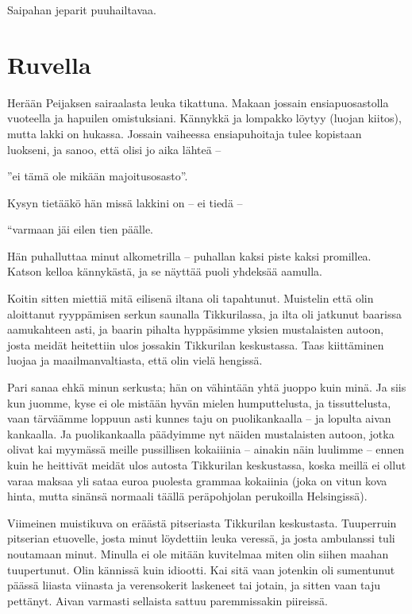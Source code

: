 \documentclass{tsnovel}
\begin{document}
Saipahan jeparit puuhailtavaa.


\section{Ruvella}
Herään Peijaksen sairaalasta leuka tikattuna. Makaan jossain ensiapuosastolla vuoteella ja hapuilen omistuksiani. Kännykkä ja lompakko löytyy (luojan kiitos), mutta lakki on hukassa. Jossain vaiheessa ensiapuhoitaja tulee kopistaan luokseni, ja sanoo, että olisi jo aika lähteä –

''ei tämä ole mikään majoitusosasto''.

Kysyn tietääkö hän missä lakkini on – ei tiedä –

``varmaan jäi eilen tien päälle.

Hän puhalluttaa minut alkometrilla – puhallan kaksi piste kaksi promillea. Katson kelloa kännykästä, ja se näyttää puoli yhdeksää aamulla.

Koitin sitten miettiä mitä eilisenä iltana oli tapahtunut. Muistelin että olin aloittanut ryyppämisen serkun saunalla Tikkurilassa, ja ilta oli jatkunut baarissa aamukahteen asti, ja baarin pihalta hyppäsimme yksien mustalaisten autoon, josta meidät heitettiin ulos jossakin Tikkurilan keskustassa. Taas kiittäminen luojaa ja maailmanvaltiasta, että olin vielä hengissä.

Pari sanaa ehkä minun serkusta; hän on vähintään yhtä juoppo kuin minä. Ja siis kun juomme, kyse ei ole mistään hyvän mielen humputtelusta, ja tissuttelusta, vaan tärväämme loppuun asti kunnes taju on puolikankaalla – ja lopulta aivan kankaalla. Ja puolikankaalla päädyimme nyt näiden mustalaisten autoon, jotka olivat kai myymässä meille pussillisen kokaiiinia – ainakin näin luulimme – ennen kuin he heittivät meidät ulos autosta Tikkurilan keskustassa, koska meillä ei ollut varaa maksaa yli sataa euroa puolesta grammaa kokaiinia (joka on vitun kova hinta, mutta sinänsä normaali täällä peräpohjolan perukoilla Helsingissä).

Viimeinen muistikuva on eräästä pitseriasta Tikkurilan keskustasta. Tuuperruin pitserian etuovelle, josta minut löydettiin leuka veressä, ja josta ambulanssi tuli noutamaan minut. Minulla ei ole mitään kuvitelmaa miten olin siihen maahan tuupertunut. Olin kännissä kuin idiootti. Kai sitä vaan jotenkin oli sumentunut päässä liiasta viinasta ja verensokerit laskeneet tai jotain, ja sitten vaan taju pettänyt. Aivan varmasti sellaista sattuu paremmissakin piireissä.
\end{document}
